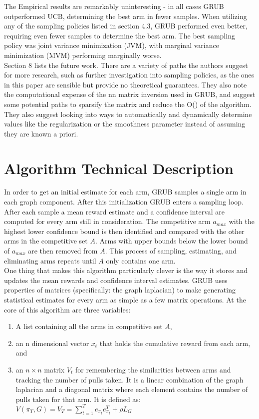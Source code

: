\documentclass{article}[12pt]
\begin{document}
The Empirical results are remarkably uninteresting - in all cases GRUB outperformed UCB, determining the best arm in fewer samples.
When utilizing any of the sampling policies listed in section 4.3, GRUB performed even better, requiring even fewer samples to determine the best arm.
The best sampling policy was joint variance minimization (JVM), with marginal variance minimization (MVM) performing marginally worse. \\

Section 8 lists the future work.
There are a variety of paths the authors suggest for more research,
such as further investigation into sampling policies,
as the ones in this paper are sensible but provide no theoretical guarantees.
They also note the computational expense of the nn matrix inversion used in GRUB,
and suggest some potential paths to sparsify the matrix and reduce the O() of the algorithm.
They also suggest looking into ways to automatically and dynamically determine values like the regularization or the smoothness parameter instead of assuming they are known a priori. \\

\pagebreak

\section{Algorithm Technical Description}

In order to get an initial estimate for each arm, GRUB samples a single arm in each graph component.
After this initialization GRUB enters a sampling loop.
After each sample a mean reward estimate and a confidence interval are computed for every arm still in consideration.
The competitive arm $a_{max}$ with the highest lower confidence bound is then identified and compared with the other arms in the competitive set $A$.
Arms with upper bounds below the lower bound of $a_{max}$ are then removed from $A$.
This process of sampling, estimating, and eliminating arms repeats until $A$ only contains one arm. \\


One thing that makes this algorithm particularly clever is the way it stores and updates the mean rewards and confidence interval estimates.
GRUB uses properties of matrices (specifically: the graph laplacian) to make generating statistical estimates for every arm as simple as a few matrix operations.
At the core of this algorithm are three variables:
\begin{enumerate}
    \item A list containing all the arms in competitive set $A$,
    \item an n dimensional vector $x_t$ that holds the cumulative reward from each arm, and
    \item an $n \times n$ matrix $V_t$ for remembering the similarities between arms and tracking the number of pulls taken.
    It is a linear combination of the graph laplacian and a diagonal matrix where each element contains the number of pulls taken for that arm.
        It is defined as: $ V(\pi_T, G) = V_T = \sum_{t=1}^T e_{\pi_t} e_{\pi_t}^T + \rho L_G $
 		
\end{enumerate}
\end{document}
